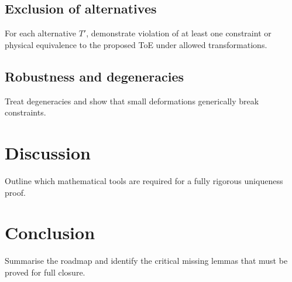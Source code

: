 \documentclass[11pt]{article}
\begin{document}
\subsection{Exclusion of alternatives}
For each alternative $T'$, demonstrate violation of at least one constraint or physical equivalence to
the proposed ToE under allowed transformations.

\subsection{Robustness and degeneracies}
Treat degeneracies and show that small deformations generically break constraints.

\section{Discussion}
Outline which mathematical tools are required for a fully rigorous uniqueness proof.

\section{Conclusion}
Summarise the roadmap and identify the critical missing lemmas that must be proved for full closure.



\end{document}
